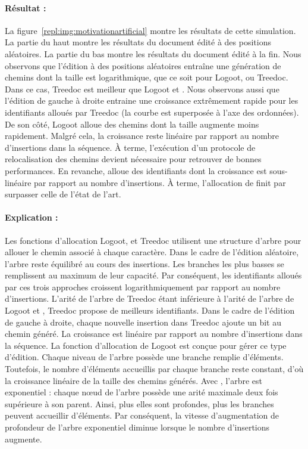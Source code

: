\paragraph{Résultat :} La figure~\ref{repl:img:motivationartificial} montre les
résultats de cette simulation. La partie du haut montre les résultats du
document édité à des positions aléatoires. La partie du bas montre les résultats
du document édité à la fin. Nous observons que l'édition à des positions
aléatoires entraîne une génération de chemins dont la taille est logarithmique,
que ce soit pour Logoot, \LSEQ ou Treedoc. Dans ce cas, Treedoc est meilleur que
Logoot et \LSEQ. Nous observons aussi que l'édition de gauche à droite entraine
une croissance extrêmement rapide pour les identifiants alloués par Treedoc (la
courbe est superposée à l'axe des ordonnées). De son côté, Logoot alloue des
chemins dont la taille augmente moins rapidement. Malgré cela, la croissance
reste linéaire par rapport au nombre d'insertions dans la séquence. À terme,
l'exécution d'un protocole de relocalisation des chemins devient nécessaire pour
retrouver de bonnes performances. En revanche, \LSEQ alloue des identifiants
dont la croissance est sous-linéaire par rapport au nombre d'insertions. À terme,
l'allocation de \LSEQ finit par surpasser celle de l'état de l'art.

\paragraph{Explication :} Les fonctions d'allocation Logoot, \LSEQ et Treedoc
utilisent une structure d'arbre pour allouer le chemin associé à chaque
caractère. Dans le cadre de l'édition aléatoire, l'arbre reste équilibré au
cours des insertions. Les branches les plus basses se remplissent au maximum de
leur capacité. Par conséquent, les identifiants alloués par ces trois approches
croissent logarithmiquement par rapport au nombre d'insertions. L'arité de
l'arbre de Treedoc étant inférieure à l'arité de l'arbre de Logoot et \LSEQ,
Treedoc propose de meilleurs identifiants. Dans le cadre de l'édition de gauche
à droite, chaque nouvelle insertion dans Treedoc ajoute un bit au chemin
généré. La croissance est linéaire par rapport au nombre d'insertions dans la
séquence.
La fonction d'allocation de Logoot est conçue pour gérer ce type
d'édition. Chaque niveau de l'arbre possède une branche remplie
d'éléments. Toutefois, le nombre d'éléments accueillis par chaque branche reste
constant, d'où la croissance linéaire de la taille des chemins générés. Avec
\LSEQ, l'arbre est exponentiel : chaque nœud de l'arbre possède une arité
maximale deux fois supérieure à son parent. Ainsi, plus elles sont profondes,
plus les branches peuvent accueillir d'éléments. Par conséquent, la vitesse
d'augmentation de profondeur de l'arbre exponentiel diminue lorsque le nombre
d'insertions augmente.


